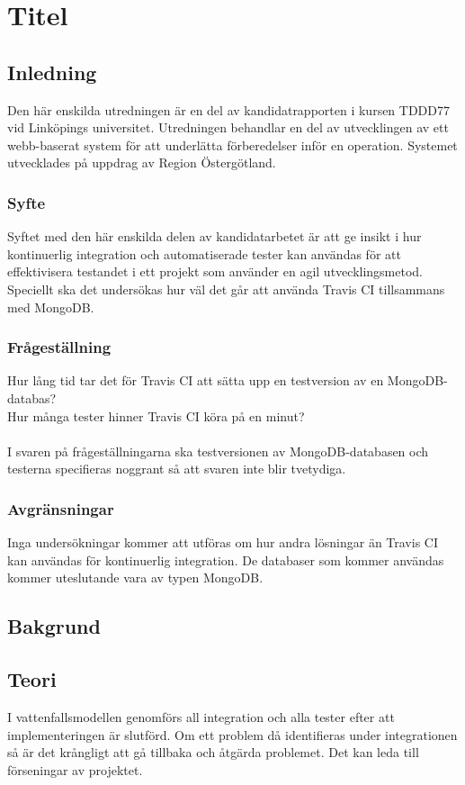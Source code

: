 \section{Titel}
\subsection{Inledning}
Den här enskilda utredningen är en del av kandidatrapporten i kursen TDDD77 vid Linköpings universitet. Utredningen behandlar en del av utvecklingen av ett webb-baserat system för att underlätta förberedelser inför en operation. Systemet utvecklades på uppdrag av Region Östergötland.

\subsubsection{Syfte}
Syftet med den här enskilda delen av kandidatarbetet är att ge insikt i hur kontinuerlig integration och automatiserade tester kan användas för att effektivisera testandet i ett projekt som använder en agil utvecklingsmetod. Speciellt ska det undersökas hur väl det går att använda Travis CI tillsammans med MongoDB.

\subsubsection{Frågeställning}
Hur lång tid tar det för Travis CI att sätta upp en testversion av en MongoDB-databas?\\
Hur många tester hinner Travis CI köra på en minut?\\\\

I svaren på frågeställningarna ska testversionen av MongoDB-databasen och testerna specifieras noggrant så att svaren inte blir tvetydiga.

\subsubsection{Avgränsningar}
Inga undersökningar kommer att utföras om hur andra lösningar än Travis CI kan användas för kontinuerlig integration. De databaser som kommer användas kommer uteslutande vara av typen MongoDB.

\subsection{Bakgrund}
\subsection{Teori}
I vattenfallsmodellen genomförs all integration och alla tester efter att implementeringen är slutförd. Om ett problem då identifieras under integrationen så är det krångligt att gå tillbaka och åtgärda problemet. Det kan leda till förseningar av projektet.\\

